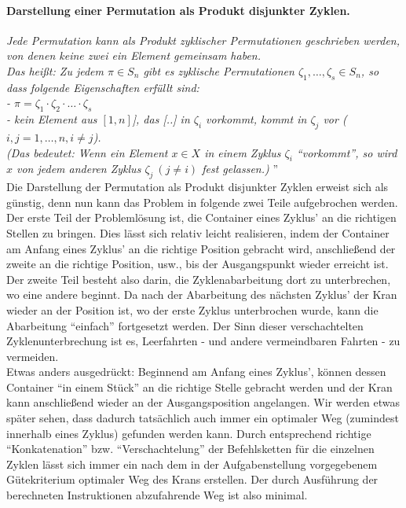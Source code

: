 \paragraph{Darstellung einer Permutation als Produkt disjunkter Zyklen.}
\emph{Jede Permutation kann als Produkt zyklischer Permutationen geschrieben werden, von denen keine zwei ein Element gemeinsam haben.}\\
\emph{Das heißt: Zu jedem $\pi \in S_n$ gibt es zyklische Permutationen $\zeta_1,\dots,\zeta_s \in S_n$,
so dass folgende Eigenschaften erfüllt sind: \\
 - $\pi=\zeta_1\cdot \zeta_2 \cdot \ldots \cdot \zeta_s$ \\
 - kein Element aus $[1,n]$], das [..] in $\zeta_i$ vorkommt, kommt in $\zeta_j$ vor ($i,j=1, \dots,n, i \neq j$).\\
(Das bedeutet: Wenn ein Element $x \in X$ in einem Zyklus $\zeta_i$ ``vorkommt'',
 so wird $x$ von jedem anderen Zyklus $\zeta_j \: (j \neq i)$ fest gelassen.)
}''\\

Die Darstellung der Permutation als Produkt disjunkter Zyklen erweist sich als günstig,
denn nun kann das Problem in folgende zwei Teile aufgebrochen werden.\\

Der erste Teil der Problemlösung ist, die Container eines Zyklus' an die richtigen Stellen zu bringen.
Dies lässt sich relativ leicht realisieren, indem der Container am Anfang eines Zyklus' an die richtige Position gebracht wird,
anschließend der zweite an die richtige Position, usw., bis der Ausgangspunkt wieder erreicht ist.
Der zweite Teil besteht also darin, die Zyklenabarbeitung dort zu unterbrechen, wo eine andere beginnt.
Da nach der Abarbeitung des nächsten Zyklus' der Kran wieder an der Position ist,
wo der erste Zyklus unterbrochen wurde, kann die Abarbeitung ``einfach'' fortgesetzt werden.
Der Sinn dieser verschachtelten Zyklenunterbrechung ist es, Leerfahrten - und andere vermeindbaren Fahrten - zu vermeiden.\\

Etwas anders ausgedrückt:
Beginnend am Anfang eines Zyklus', können dessen Container ``in einem Stück'' an die richtige Stelle gebracht werden
 und der Kran kann anschließend wieder an der Ausgangsposition angelangen.
Wir werden etwas später sehen, dass dadurch tatsächlich auch immer ein optimaler Weg (zumindest innerhalb eines Zyklus) gefunden werden kann.
Durch entsprechend richtige ``Konkatenation'' bzw. ``Verschachtelung'' der Befehlsketten für die einzelnen Zyklen lässt sich immer
 ein nach dem in der Aufgabenstellung vorgegebenem Gütekriterium optimaler Weg des Krans erstellen.
Der durch Ausführung der berechneten Instruktionen abzufahrende Weg ist also minimal.
